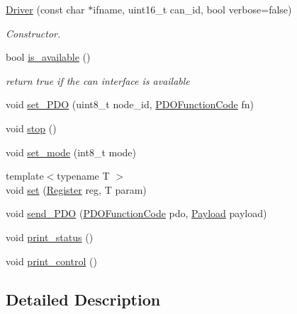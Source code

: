 \begin{DoxyCompactItemize}
\item 
\hyperlink{class_c_a_nopen_1_1_driver_a353dee2678e6049c216805dead97abfc}{Driver} (const char $\ast$ifname, uint16\+\_\+t can\+\_\+id, bool verbose=false)
\begin{DoxyCompactList}\small\item\em Constructor. \end{DoxyCompactList}\item 
bool \hyperlink{class_c_a_nopen_1_1_driver_a249f11262c9264cf53486c247d004b99}{is\+\_\+available} ()
\begin{DoxyCompactList}\small\item\em return true if the can interface is available \end{DoxyCompactList}\item 
void \hyperlink{class_c_a_nopen_1_1_driver_af549ce9c0b8c8125f8ddf26fab6810cf}{set\+\_\+\+P\+DO} (uint8\+\_\+t node\+\_\+id, \hyperlink{class_c_a_nopen_1_1_driver_af1538f81dbeb9dcafee3ff1a71c95be4}{P\+D\+O\+Function\+Code} fn)
\item 
void \hyperlink{class_c_a_nopen_1_1_driver_abd7d88699d02c007d5f23e608d8f0a0a}{stop} ()
\item 
void \hyperlink{class_c_a_nopen_1_1_driver_a35e035da9a3f9d6771f3e8b54ac80e73}{set\+\_\+mode} (int8\+\_\+t mode)
\item 
{\footnotesize template$<$typename T $>$ }\\void \hyperlink{class_c_a_nopen_1_1_driver_a66b64a600d9a0cdada81071b8cb412c8}{set} (\hyperlink{class_c_a_nopen_1_1_driver_a9504ce08c5bec248880fe4e6803565f7}{Register} reg, T param)
\item 
void \hyperlink{class_c_a_nopen_1_1_driver_ad82b69bd6c10c53ce4c7f766259ce804}{send\+\_\+\+P\+DO} (\hyperlink{class_c_a_nopen_1_1_driver_af1538f81dbeb9dcafee3ff1a71c95be4}{P\+D\+O\+Function\+Code} pdo, \hyperlink{class_c_a_nopen_1_1_payload}{Payload} payload)
\item 
void \hyperlink{class_c_a_nopen_1_1_driver_a2aab98740682098ccbfee1b8d3476c7a}{print\+\_\+status} ()
\item 
void \hyperlink{class_c_a_nopen_1_1_driver_a9bddeea1ccb9854c2b775248778903b5}{print\+\_\+control} ()
\end{DoxyCompactItemize}


\subsection{Detailed Description}


